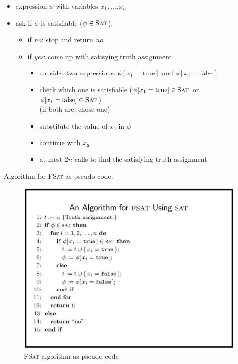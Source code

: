 \documentclass[a4]{scrartcl}
\begin{document}
\begin{itemize}
\item expression $\phi$ with variables $x_1, ... , x_n$

\item ask if $\phi$ is satisfiable ($\phi \in \textsc{Sat}$):
\begin{itemize}
\item if \textit{no}: stop and return \textit{no}
\item if \textit{yes}: come up with satisying truth assignment

\begin{itemize}
\item consider two expressions: $\phi[x_1 = \text{true}]$ and $\phi[x_1 = \text{false}]$
\item check which one is satisfiable ($\phi[x_1 = \text{true}] \in \textsc{Sat}$ or $\phi[x_1 = \text{false}] \in \textsc{Sat}$) \\
(if both are, chose one)
\item substitute the value of $x_1$ in $\phi$ 
\item continue with $x_2$
\item at most $2n$ calls to find the satisfying truth assignment
\end{itemize}

\end{itemize}

\end{itemize}

Algorithm for \textsc{FSat} as pseudo code:

\begin{figure}[H]
\begin{center}
\includegraphics[scale=0.6]{fsat.jpg}
\end{center}
\caption{\textsc{FSat} algorithm as pseudo code \cite{RCV}}
\end{figure}
\end{document}
